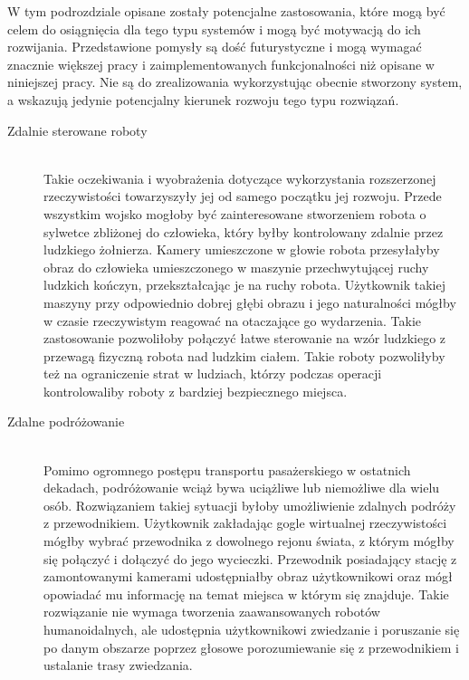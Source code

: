 \documentclass[a4paper,11pt,twoside]{report}
\theoremstyle{definition}
\begin{document}
W tym podrozdziale opisane zostały potencjalne zastosowania, które mogą być celem do osiągnięcia dla tego typu systemów i mogą być motywacją do ich rozwijania. Przedstawione pomysły są dość futurystyczne i mogą wymagać znacznie większej pracy i zaimplementowanych funkcjonalności niż opisane w niniejszej pracy. Nie są do zrealizowania wykorzystując obecnie stworzony system, a wskazują jedynie potencjalny kierunek rozwoju tego typu rozwiązań.

\begin{description}
\item [Zdalnie sterowane roboty] \hfill \\
Takie oczekiwania i wyobrażenia dotyczące wykorzystania rozszerzonej rzeczywistości towarzyszyły jej od samego początku jej rozwoju. Przede wszystkim wojsko mogłoby być zainteresowane stworzeniem robota o sylwetce zbliżonej do człowieka, który byłby kontrolowany zdalnie przez ludzkiego żołnierza. Kamery umieszczone w głowie robota przesyłałyby obraz do człowieka umieszczonego w maszynie przechwytującej ruchy ludzkich kończyn, przekształcając je na ruchy robota. Użytkownik takiej maszyny przy odpowiednio dobrej głębi obrazu i jego naturalności mógłby w czasie rzeczywistym reagować na otaczające go wydarzenia. Takie zastosowanie pozwoliłoby połączyć łatwe sterowanie na wzór ludzkiego z przewagą fizyczną robota nad ludzkim ciałem. Takie roboty pozwoliłyby też na ograniczenie strat w ludziach, którzy podczas operacji kontrolowaliby roboty z bardziej bezpiecznego miejsca.
  
\item [Zdalne podróżowanie] \hfill \\
Pomimo ogromnego postępu transportu pasażerskiego w ostatnich dekadach, podróżowanie wciąż bywa uciążliwe lub niemożliwe dla wielu osób. Rozwiązaniem takiej sytuacji byłoby umożliwienie zdalnych podróży z przewodnikiem. Użytkownik zakładając gogle wirtualnej rzeczywistości mógłby wybrać przewodnika z dowolnego rejonu świata, z którym mógłby się połączyć i dołączyć do jego wycieczki. Przewodnik posiadający stację z zamontowanymi kamerami udostępniałby obraz użytkownikowi oraz mógł opowiadać mu informację na temat miejsca w którym się znajduje. Takie rozwiązanie nie wymaga tworzenia zaawansowanych robotów humanoidalnych, ale udostępnia użytkownikowi zwiedzanie i poruszanie się po danym obszarze poprzez głosowe porozumiewanie się z przewodnikiem i ustalanie trasy zwiedzania.
\end{description}
\end{document}
